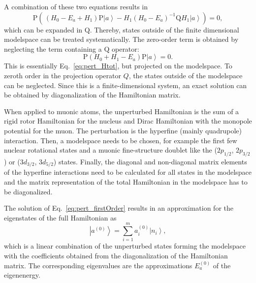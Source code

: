 A combination of these two equations results in
\begin{equation}
\text{P}\left( \,
(H_0-E_a+H_1)\text{P}\left|a\right>
- H_1(H_0-E_a)^{-1}\text{Q}H_1\left|a\right>
\right) = 0,
\label{eq:pert_projectionEq}
\end{equation}
which can be expanded in $\text{Q}$. Thereby, states outside of the finite dimensional modelspace can be treated systematically. The zero-order term is obtained by neglecting the term containing a $\text{Q}$ operator:
\begin{equation}
\label{eq:pert_firstOrder}
\text{P}\left(H_0+H_1-E_a\right) \text{P}\left|a\right> = 0.
\end{equation}
This is essentially Eq.~\eqref{eq:pert_Htot}, but projected on the modelspace. To zeroth order in the projection operator $Q$, the states outside of the modelspace can be neglected. Since this is a finite-dimensional system, an exact solution can be obtained by diagonalization of the Hamiltonian matrix.

When applied to muonic atoms, the unperturbed Hamiltonian is the sum of  a rigid rotor Hamiltonian for the nucleus and Dirac Hamiltonian with the monopole potential for the muon. The perturbation is the hyperfine (mainly quadrupole) interaction. Then, a modelspace needs to be chosen, for example the first few nuclear rotational states and a muonic fine-structure doublet like the ($2p_{1/2}$, $2p_{3/2}$) or ($3d_{3/2}$, $3d_{5/2}$) states. Finally, the diagonal and non-diagonal matrix elements of the hyperfine interactions need to be calculated for all states in the modelspace and the matrix representation of the total Hamiltonian in the modelspace has to be diagonalized.

The solution of Eq.~\eqref{eq:pert_firstOrder} results in an approximation for the eigenstates of the full Hamiltonian as
\begin{equation}
\label{eq:pert_firstOrderState}
\left|a^{(0)}\right> = \sum_{i=1}^m a_i^{(0)}\left|n_i\right>,
\end{equation}
which is a linear combination of the unperturbed states forming the modelspace with the coefficients obtained from the diagonalization of the Hamiltonian matrix. The corresponding eigenvalues are the approximations $E_a^{(0)}$ of the eigenenergy.

